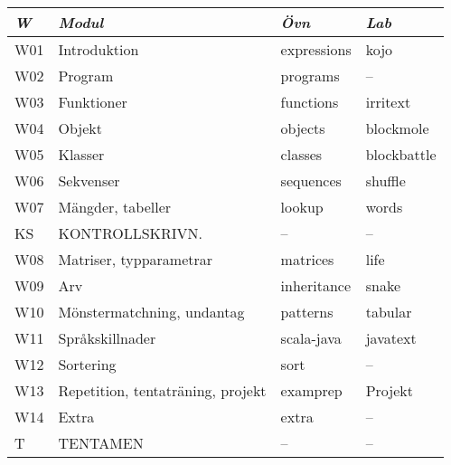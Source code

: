 \begin{tabular}{l|l|l|l}
\textit{W} & \textit{Modul} & \textit{Övn} & \textit{Lab} \\ \hline \hline
W01 & Introduktion & expressions & kojo \\
W02 & Program & programs & -- \\
W03 & Funktioner & functions & irritext \\
W04 & Objekt & objects & blockmole \\
W05 & Klasser & classes & blockbattle \\
W06 & Sekvenser & sequences & shuffle \\
W07 & Mängder, tabeller & lookup & words \\
KS & KONTROLLSKRIVN. & -- & -- \\
W08 & Matriser, typparametrar & matrices & life \\
W09 & Arv & inheritance & snake \\
W10 & Mönstermatchning, undantag & patterns & tabular \\
W11 & Språkskillnader & scala-java & javatext \\
W12 & Sortering & sort & -- \\
W13 & Repetition, tentaträning, projekt & examprep & Projekt \\
W14 & Extra & extra & -- \\
T & TENTAMEN & -- & -- \\
\end{tabular}
